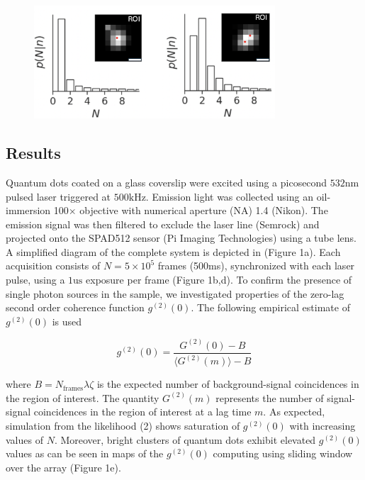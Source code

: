 \documentclass[a4paper, twocolumn, superscriptaddress,prl]{revtex4}  %
\begin{document}
\begin{figure}
\includegraphics[width=9cm]{Figure-4.png}
\caption{}
\end{figure}   



\subsection{Results}

Quantum dots coated on a glass coverslip were excited using a picosecond $532\mathrm{nm}$ pulsed laser triggered at $500\mathrm{kHz}$. Emission light was collected using an oil-immersion 100$\times$ objective with numerical aperture (NA) 1.4 (Nikon). The emission signal was then filtered to exclude the laser line (Semrock) and projected onto the SPAD512 sensor (Pi Imaging Technologies) using a tube lens. A simplified diagram of the complete system is depicted in (Figure 1a). Each acquisition consists of $N=5\times 10^{5}$ frames (500ms), synchronized with each laser pulse, using a $1\mathrm{us}$ exposure per frame (Figure 1b,d). To confirm the presence of single photon sources in the sample, we investigated properties of the zero-lag second order coherence function $g^{(2)}(0)$. The following empirical estimate of $g^{(2)}(0)$ is used \citep{Israel2017}

\begin{equation}
g^{(2)}(0) = \frac{G^{(2)}(0)-B}{\langle G^{(2)}(m)\rangle -B}
\end{equation}

where $B = N_{\mathrm{frames}}\lambda\zeta$ is the expected number of background-signal coincidences in the region of interest. The quantity $G^{(2)}(m)$ represents the number of signal-signal coincidences in the region of interest at a lag time $m$. As expected, simulation from the likelihood (2) shows saturation of $g^{(2)}(0)$  with increasing values of $N$. Moreover, bright clusters of quantum dots exhibit elevated $g^{(2)}(0)$ values as can be seen in maps of the $g^{(2)}(0)$ computing using sliding window over the array (Figure 1e).
\end{document}
